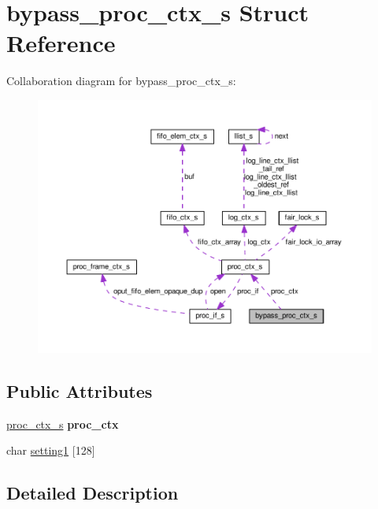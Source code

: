 \hypertarget{structbypass__proc__ctx__s}{}\section{bypass\+\_\+proc\+\_\+ctx\+\_\+s Struct Reference}
\label{structbypass__proc__ctx__s}


Collaboration diagram for bypass\+\_\+proc\+\_\+ctx\+\_\+s\+:\nopagebreak
\begin{figure}[H]
\begin{center}
\leavevmode
\includegraphics[width=350pt]{structbypass__proc__ctx__s__coll__graph}
\end{center}
\end{figure}
\subsection*{Public Attributes}
\begin{DoxyCompactItemize}
\item 
\hyperlink{structproc__ctx__s}{proc\+\_\+ctx\+\_\+s} {\bfseries proc\+\_\+ctx}\hypertarget{structbypass__proc__ctx__s_a5a1062e8893420f866d4b291a5b78fd9}{}\label{structbypass__proc__ctx__s_a5a1062e8893420f866d4b291a5b78fd9}

\item 
char \hyperlink{structbypass__proc__ctx__s_aad5fb610a17e7125f87c7cea253cff60}{setting1} \mbox{[}128\mbox{]}
\end{DoxyCompactItemize}


\subsection{Detailed Description}


